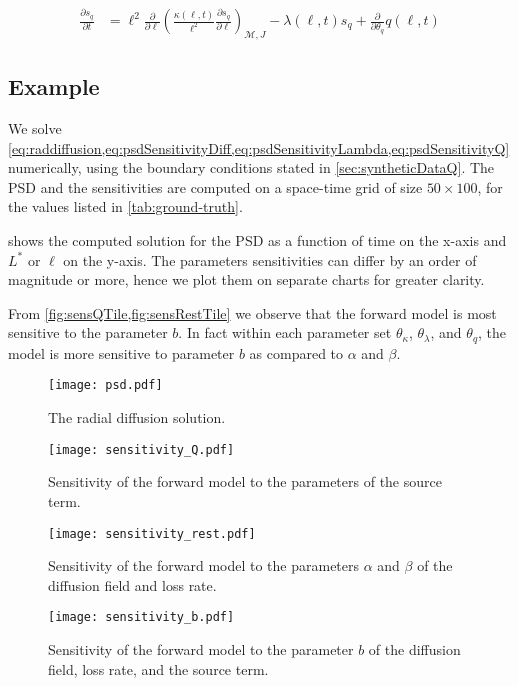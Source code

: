 \begin{equation}\label{eq:psdSensitivityQ}
    \begin{aligned}
        \frac{\partial{s_{q}}}{\partial{t}} &= \ell^2 \frac{\partial}{\partial{\ell}} \left( 
            \frac{\kappa(\ell, t)}{\ell^{2}} \frac{\partial{s_{q}}}{\partial{\ell}} 
        \right)_{\mathcal{M}, J}
         - \lambda(\ell, t) s_{q}
         + \frac{\partial}{\partial{\theta_{q}}}q(\ell, t)
    \end{aligned}
\end{equation}

\subsection*{Example}

We solve \cref{eq:raddiffusion,eq:psdSensitivityDiff,eq:psdSensitivityLambda,eq:psdSensitivityQ} 
numerically, using the boundary conditions stated in \cref{sec:syntheticDataQ}. The PSD and the 
sensitivities are computed on a space-time grid of size $50\times100$, for the values listed in 
\cref{tab:ground-truth}.

 shows the computed solution for the PSD as a function of time on the x-axis and 
$L^{\ast}$ or $\ell$ on the y-axis. The parameters sensitivities can differ by an order of 
magnitude or more, hence we plot them on separate charts for greater clarity.

From \cref{fig:sensQTile,fig:sensRestTile} we observe that the forward model is most sensitive to 
the parameter $b$. In fact within each parameter set $\theta_{\kappa}$, $\theta_{\lambda}$, and 
$\theta_{q}$, the model is more sensitive to parameter $b$ as compared to $\alpha$ and $\beta$. 


\begin{figure}[ht]
    \centering
    \noindent\texttt{[image: psd.pdf]}
    \caption{The radial diffusion solution.}
    \label{fig:psdTile}
\end{figure}

\begin{figure}[ht]
    \centering
    \noindent\texttt{[image: sensitivity\_Q.pdf]}
    \caption{Sensitivity of the forward model to the parameters of the source term.}
    \label{fig:sensQTile}
\end{figure}

\begin{figure}[ht]
    \centering
    \noindent\texttt{[image: sensitivity\_rest.pdf]}
    \caption{
        Sensitivity of the forward model to the parameters $\alpha$ and $\beta$ of 
        the diffusion field and loss rate.}
    \label{fig:sensRestTile}
\end{figure}

\begin{figure}[ht]
    \centering
    \noindent\texttt{[image: sensitivity\_b.pdf]}
    \caption{
        Sensitivity of the forward model to the parameter $b$ of 
        the diffusion field, loss rate, and the source term.}
    \label{fig:sensbTile}
\end{figure}